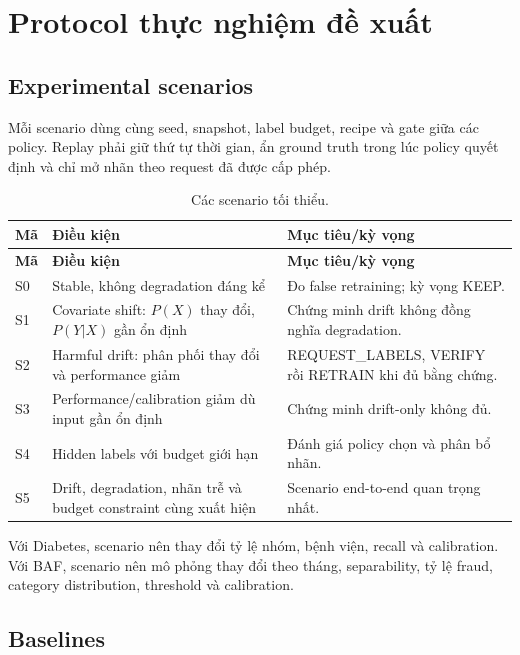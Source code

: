 \section{Protocol thực nghiệm đề xuất}

\subsection{Experimental scenarios}

Mỗi scenario dùng cùng seed, snapshot, label budget, recipe và gate giữa các policy. Replay phải giữ thứ tự thời gian, ẩn ground truth trong lúc policy quyết định và chỉ mở nhãn theo request đã được cấp phép.

\begin{longtable}{@{}L{1.3cm} L{6.5cm} L{\dimexpr\linewidth-7.8cm-4\tabcolsep\relax}@{}}
\caption{Các scenario tối thiểu.}\label{tab:scenarios}\\
\toprule\textbf{Mã} & \textbf{Điều kiện} & \textbf{Mục tiêu/kỳ vọng}\\
\midrule\endfirsthead
\toprule\textbf{Mã} & \textbf{Điều kiện} & \textbf{Mục tiêu/kỳ vọng}\\
\midrule\endhead
S0 & Stable, không degradation đáng kể & Đo false retraining; kỳ vọng KEEP.\\
S1 & Covariate shift: \(P(X)\) thay đổi, \(P(Y|X)\) gần ổn định & Chứng minh drift không đồng nghĩa degradation.\\
S2 & Harmful drift: phân phối thay đổi và performance giảm & REQUEST\_LABELS, VERIFY rồi RETRAIN khi đủ bằng chứng.\\
S3 & Performance/calibration giảm dù input gần ổn định & Chứng minh drift-only không đủ.\\
S4 & Hidden labels với budget giới hạn & Đánh giá policy chọn và phân bổ nhãn.\\
S5 & Drift, degradation, nhãn trễ và budget constraint cùng xuất hiện & Scenario end-to-end quan trọng nhất.\\
\bottomrule
\end{longtable}

Với Diabetes, scenario nên thay đổi tỷ lệ nhóm, bệnh viện, recall và calibration. Với BAF, scenario nên mô phỏng thay đổi theo tháng, separability, tỷ lệ fraud, category distribution, threshold và calibration.

\subsection{Baselines}

